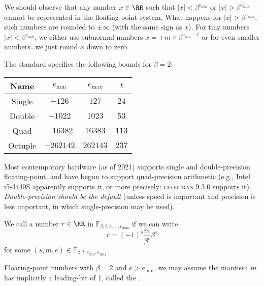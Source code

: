 \begin{ddanger}
  We should observe that any number $x\in\RR$ such that $|x|<\beta^{e_{\text{min}}}$
  or $|x|>\beta^{e_{\text{max}}}$ cannot be represented in
  the floating-point system. What happens for
  $|x|>\beta^{e_{\text{max}}}$, such numbers are rounded to $\pm\infty$
  (with the same sign as $x$). For tiny numbers $|x|<\beta^{e_{\text{min}}}$,
  we either use subnormal numbers $x=\pm m\times\beta^{e_{\text{min}}-t}$
  or for even smaller numbers\dots we just round $x$ down to zero.
\end{ddanger}


\begin{rmk}
  The  standard specifies the following bounds for $\beta=2$:
  \begin{center}
    \begin{tabular}{|c|c|c|c|}
      Name   & $e_{\text{min}}$ & $e_{\text{max}}$ & $t$ \\\hline
      Single & $-126$         & $127$          & $24$\\
      Double & $-1022$        & $1023$         & $53$\\
      Quad   & $-16382$       & $16383$        & $113$\\
      Octuple & $-262142$     & $262143$       & $237$
    \end{tabular}
  \end{center}
  Most contemporary hardware (as of 2021) supports single and
  double-precision floating-point, and have begun to support
  quad-precision arithmetic (e.g., Intel i5-4440S apparently supports
  it, or more precisely: \textsc{gfortran} $9.3.0$ supports
  it). \emph{Double-precision should be the default} (unless speed is important
  and precision is less important, in which single-precision may be used).
\end{rmk}


\begin{defn}
  We call a number $r\in\RR$  in
  $\mathbb{F}_{\beta,t,e_{\text{min}},e_{\text{max}}}$ if we can write
  \begin{equation}
    r = (-1)^{s}\frac{m}{\beta^{t}}\beta^{e}
  \end{equation}
  for some $(s,m,e)\in\mathbb{F}_{\beta,t,e_{\text{min}},e_{\text{max}}}$.
\end{defn}


\begin{defn}
  Floating-point numbers with $\beta=2$ and $e>e_{\text{min}}$, we may
  assume the mantissa $m$ has implicitly a leading-bit of 1,
  called the .
\end{defn}



